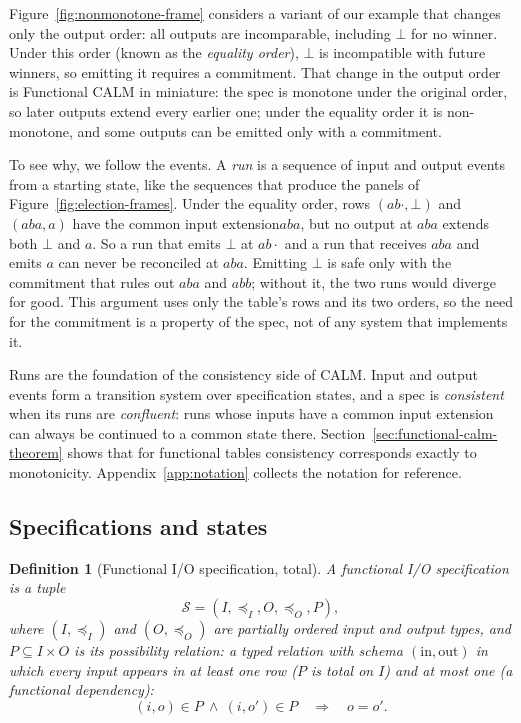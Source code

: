 \documentclass[sigconf]{cidr-2027}
\newtheorem{definition}{Definition}
\theoremstyle{remark}
\newcommand{\InputOrd}{\preceq_I}
\newcommand{\OutputOrd}{\preceq_O}
\newcommand{\commitment}{commitment\xspace}
\newcommand{\indesc}{input extension\xspace} %
\newcommand{\outrel}{extends\xspace}          %
\newcommand{\outrelbase}{extend\xspace}       %
\newcommand{\Spec}{\mathcal{S}}
\newcommand{\spectype}[1][]{I/O specification#1\xspace}
\begin{document}
Figure~\ref{fig:nonmonotone-frame} considers a variant of our example that
changes only the output order: all outputs are incomparable, including $\bot$
for no winner. Under this order (known as the \emph{equality order}), $\bot$ is
incompatible with future winners, so emitting it requires a \commitment.  That
change in the output order is Functional CALM in miniature: the spec is monotone
under the original order, so later outputs \outrelbase every earlier one; under
the equality order it is non-monotone, and some outputs can be emitted only with a \commitment.

To see why, we follow the events.  A \emph{run} is a sequence of input and output
events from a starting state, like the sequences that produce the panels of
Figure~\ref{fig:election-frames}.  Under the equality order, rows
$(ab\cdot,\bot)$ and $(aba,a)$ have the common \indesc $aba$, but no output at
$aba$ \outrel both $\bot$ and $a$.  So a run that emits $\bot$ at $ab\cdot$ and
a run that receives $aba$ and emits $a$ can never be reconciled at $aba$.
Emitting $\bot$ is safe only with the \commitment that rules out $aba$ and
$abb$; without it, the two runs would diverge for good.  This argument uses only
the table's rows and its two orders, so the need for the \commitment is a
property of the spec, not of any system that implements it.

Runs are the foundation of the consistency side of CALM.  Input and output
events form a transition system over specification states, and a spec is
\emph{consistent} when its runs are \emph{confluent}: runs whose inputs have a
common \indesc can always be continued to a common state there.
Section~\ref{sec:functional-calm-theorem} shows that for functional tables consistency corresponds exactly to
monotonicity.
Appendix~\ref{app:notation} collects the notation for reference.

\subsection{Specifications and states}
\label{sec:functional-specifications}

\begin{definition}[Functional \spectype, total]
\label{def:functional-specification}
A \emph{functional \spectype} is a tuple
\[
  \Spec=(I,\InputOrd,O,\OutputOrd,P),
\]
  where $(I,\InputOrd)$ and $(O,\OutputOrd)$ are partially ordered input and
  output types, and $P\subseteq I\times O$ is its \emph{possibility relation}:
  a typed relation with schema $(\mathrm{in},\mathrm{out})$ in which every
  input appears in at least one row ($P$ is \emph{total} on $I$) and at most one
  (a functional dependency):
\[
  (i,o)\in P\ \land\ (i,o')\in P
  \quad\Longrightarrow\quad o=o'.
\]
\end{definition}
\end{document}

